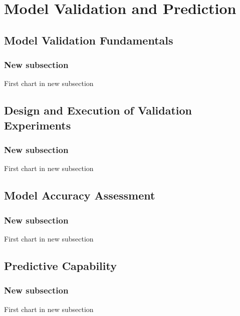 % 

\section{Model Validation and Prediction}

\subsection{Model Validation Fundamentals}
\begin{frame}\frametitle{New subsection}
	First chart in new subsection
\end{frame}

\subsection{Design and Execution of Validation Experiments}
\begin{frame}\frametitle{New subsection}
	First chart in new subsection
\end{frame}

\subsection{Model Accuracy Assessment}
\begin{frame}\frametitle{New subsection}
	First chart in new subsection
\end{frame}

\subsection{Predictive Capability}
\begin{frame}\frametitle{New subsection}
	First chart in new subsection
\end{frame}


\endinput  %
